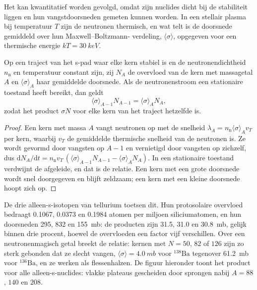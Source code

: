 Het  kan kwantitatief worden gevolgd, omdat zijn nuclides dicht bij de stabiliteit liggen en
hun vangstdoorsneden gemeten kunnen worden. In een stellair plasma
bij temperatuur $T$ zijn de neutronen thermisch, en wat telt is
de doorsnede gemiddeld over hun Maxwell--Boltzmann-
verdeling, $\langle\sigma\rangle$, opgegeven voor een thermische energie
$kT = \qty{30}{keV}$.

\begin{proposition}\label{prop:b3:origin-of-elements:sigma-n}
Op een traject van het s-pad waar elke kern stabiel is en de neutronendichtheid
$n_\mathrm{n}$ en temperatuur constant zijn, zij $N_A$ de
overvloed van de kern met massagetal $A$ en $\langle\sigma\rangle_A$
haar gemiddelde doorsnede. Als de neutronenstroom een stationaire
toestand heeft bereikt, dan geldt
\[
\langle\sigma\rangle_{A-1} N_{A-1} = \langle\sigma\rangle_A N_A ,
\]
zodat het product $\sigma N$ voor elke kern van het
traject hetzelfde is.
\end{proposition}

\begin{proof}
Een kern met massa $A$ vangt neutronen op met de snelheid
$\lambda_A = n_\mathrm{n}\langle\sigma\rangle_A v_T$ per kern, waarbij
$v_T$ de gemiddelde thermische snelheid van de neutronen is. Ze wordt gevormd door vangsten op
$A - 1$ en vernietigd door vangsten op zichzelf, dus
$\mathrm{d}N_A/\mathrm{d}t = n_\mathrm{n} v_T\,(\langle\sigma\rangle_{A-1}
N_{A-1} - \langle\sigma\rangle_A N_A)$. In een stationaire toestand verdwijnt de
afgeleide, en dat is de relatie. Een kern met een grote doorsnede wordt
snel doorgegeven en blijft zeldzaam; een kern met een kleine doorsnede hoopt
zich op.
\end{proof}

De drie alleen-s-isotopen van tellurium toetsen dit. Hun protosolaire
overvloed bedraagt \num{0.1067}, \num{0.0373} en \num{0.1984} atomen per
miljoen siliciumatomen, en hun doorsneden \num{295}, \num{832} en
\qty{155}{mb}: de producten zijn \num{31.5}, \num{31.0} en
\qty{30.8}{mb}, gelijk binnen drie procent, hoewel de overvloeden
een factor vijf verschillen. Over een neutronenmagisch getal breekt de relatie:
kernen met $N = 50$, $82$ of $126$ zijn zo sterk gebonden dat
ze slecht vangen, $\langle\sigma\rangle = \qty{4.0}{mb}$ voor
$^{138}\mathrm{Ba}$ tegenover \qty{61.2}{mb} voor $^{136}\mathrm{Ba}$, en
ze werken als flessenhalzen. De figuur hieronder toont het product voor alle
alleen-s-nuclides: vlakke plateaus gescheiden door sprongen nabij $A = 88$, $140$
en $208$.

